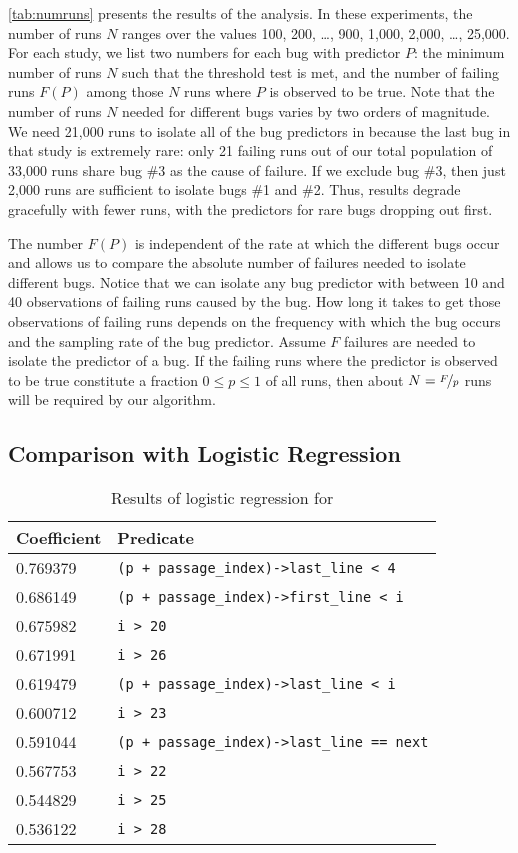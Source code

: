 \autoref{tab:numruns} presents the results of the analysis.  
In these experiments, the number of runs $N$ ranges over the values
100, 200, \ldots, 900, 1,000, 2,000, \ldots, 25,000.
For each study, we list two numbers for each bug with predictor $P$:
the minimum number of runs $N$ such that the threshold test is met, and the
number of failing runs $F(P)$ among those $N$ runs where $P$ is
observed to be true.  Note that the number of runs $N$ needed for
different bugs varies by two orders of magnitude.  We need 21,000 runs
to isolate all of the bug predictors in \exif{} because the last bug in that study is extremely rare: only 21
failing runs out of our total population of 33,000 runs share bug \#3
as the cause of failure.  If we exclude bug \#3, then just 2,000 runs
are sufficient to isolate \exif{} bugs \#1 and \#2.
Thus, results
degrade gracefully with fewer runs, with the predictors
for rare bugs dropping out first.

The number $F(P)$ is independent of the rate at which the different
bugs occur and allows us to compare the absolute number of failures
needed to isolate different bugs.  Notice that 
we can isolate any bug predictor with between 10 and 40 observations of
failing runs caused by the bug.  How long it takes
to get those observations of failing runs depends on the frequency
with which the bug occurs and the sampling rate of the bug predictor.
Assume $F$ failures are needed to isolate the predictor of a bug.
If the failing runs where the predictor is observed to be
true constitute a fraction $0 \leq p \leq 1$ of all runs,
then about $N = \nicefrac{F}{p}$ runs will be required by our algorithm.


\subsection{Comparison with Logistic Regression}
\label{sec:comparison}

\begin{table}
\nocaptionrule
\caption{Results of logistic regression for \moss}
\label{tab:logregression}
\centering
\scriptsize
\begin{tabular}{ll}
  \toprule
  Coefficient & Predicate \\
  \midrule
  0.769379 & \verb|(p + passage_index)->last_line < 4| \\
  0.686149 & \verb|(p + passage_index)->first_line < i| \\
  0.675982 & \verb|i > 20| \\
  0.671991 & \verb|i > 26| \\
  0.619479 & \verb|(p + passage_index)->last_line < i| \\
  0.600712 & \verb|i > 23| \\
  0.591044 & \verb|(p + passage_index)->last_line == next| \\
  0.567753 & \verb|i > 22| \\
  0.544829 & \verb|i > 25| \\
  0.536122 & \verb|i > 28| \\
  \bottomrule
\end{tabular}
\end{table}


